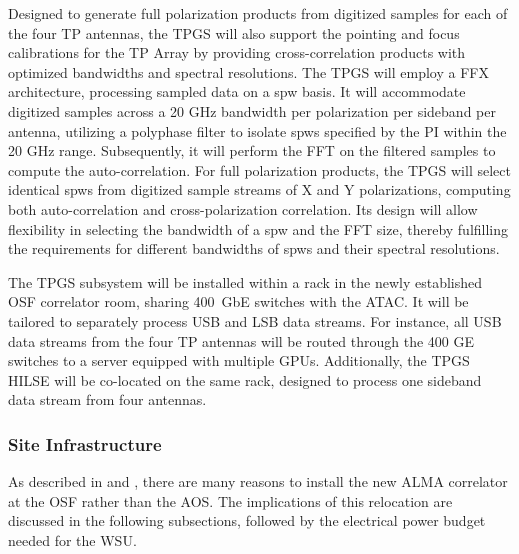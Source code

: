 Designed to generate full polarization products from digitized samples for each of the four TP antennas, the TPGS will also support the pointing and focus calibrations for the TP Array by providing cross-correlation products with optimized bandwidths and spectral resolutions. The TPGS will employ a FFX architecture, processing sampled data on a spw basis. It will accommodate digitized samples across a 20 GHz bandwidth per polarization per sideband per antenna, utilizing a polyphase filter to isolate spws specified by the PI within the 20 GHz range. Subsequently, it will perform the FFT on the filtered samples to compute the auto-correlation. For full polarization products, the TPGS will select identical spws from digitized sample streams of X and Y polarizations, computing both auto-correlation and cross-polarization correlation. Its design will allow flexibility in selecting the bandwidth of a spw and the FFT size, thereby fulfilling the requirements for different bandwidths of spws and their spectral resolutions.

The TPGS subsystem will be installed within a rack in the newly established OSF correlator room, sharing 400~GbE switches with the ATAC. It will be tailored to separately process USB and LSB data streams. For instance, all USB data streams from the four TP antennas will be routed through the 400 GE switches to a server equipped with multiple GPUs. Additionally, the TPGS HILSE will be co-located on the same rack, designed to process one sideband data stream from four antennas.


\subsubsection{Site Infrastructure}
As described in \cite{2ndgen} and \cite{scwg}, there are many reasons to install the new ALMA correlator at the OSF rather than the AOS. The implications of this relocation are discussed in the following subsections, followed by the electrical power budget needed for the WSU. 


